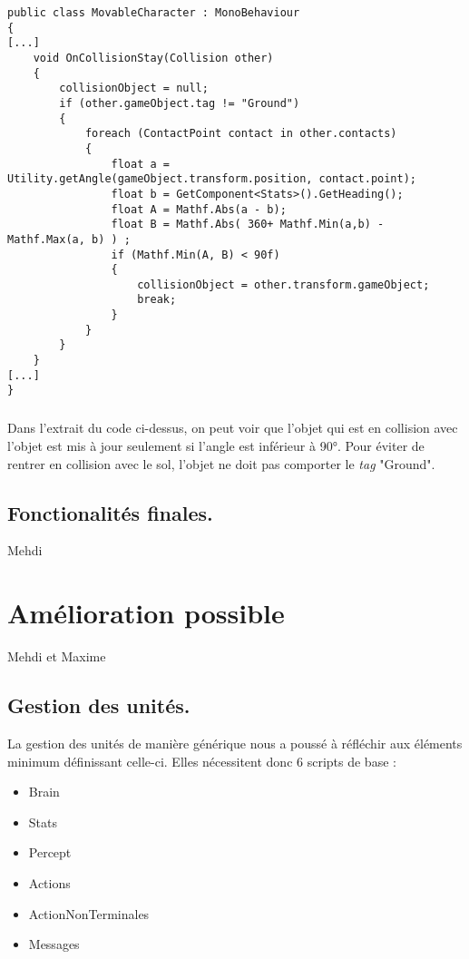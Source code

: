 \documentclass{report}
\begin{document}
 \begin{lstlisting}[language={[Sharp]C},label={lst:MovableCharacterCollisionScript}, caption= Extrait du code de MovableCharacter.cs]
public class MovableCharacter : MonoBehaviour
{
[...]
    void OnCollisionStay(Collision other)
    {
        collisionObject = null;
        if (other.gameObject.tag != "Ground")
        {
            foreach (ContactPoint contact in other.contacts)
            {
                float a = Utility.getAngle(gameObject.transform.position, contact.point);
                float b = GetComponent<Stats>().GetHeading();
                float A = Mathf.Abs(a - b);
                float B = Mathf.Abs( 360+ Mathf.Min(a,b) - Mathf.Max(a, b) ) ;
                if (Mathf.Min(A, B) < 90f)
                {
                    collisionObject = other.transform.gameObject;
                    break;
                }
            }
        }
    }
[...]
}
\end{lstlisting}
\subparagraph{} Dans l'extrait du code ci-dessus, on peut voir que l'objet qui est en collision avec l'objet est mis à jour seulement si l'angle est inférieur à 90°. Pour éviter de rentrer en collision avec le sol, l'objet ne doit pas comporter le \textit{tag} "Ground".





\subsection{Fonctionalités finales.}
Mehdi

\section{Amélioration possible}
Mehdi et Maxime
\subsection{Gestion des unités.}

La gestion des unités de manière générique nous a poussé à réfléchir aux éléments minimum définissant celle-ci.
Elles nécessitent donc 6 scripts de base : 
\begin{itemize}
\item Brain
\item Stats
\item Percept
\item Actions
\item ActionNonTerminales
\item Messages
\end{itemize}
\end{document}
